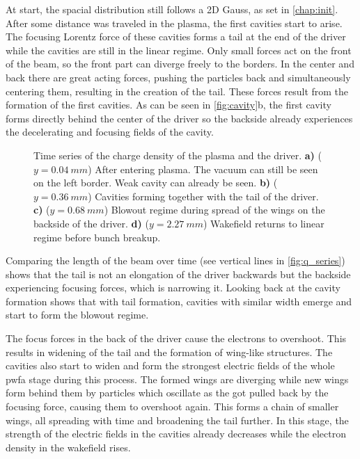 \documentclass[bachelor_thesis]{subfiles}
\begin{document}
At start, the spacial distribution still follows a 2D Gauss, as set in \autoref{chap:init}. After some distance was traveled in the plasma, the first cavities start to arise. The focusing Lorentz force of these cavities forms a tail at the end of the driver while the cavities are still in the linear regime.
Only small forces act on the front of the beam, so the front part can diverge freely to the borders. In the center and back there are great acting forces, pushing the particles back and simultaneously centering them, resulting in the creation of the tail.
These forces result from the formation of the first cavities. As can be seen in \autoref{fig:cavity}b, the first cavity forms directly behind the center of the driver so the backside already experiences the decelerating and focusing fields of the cavity.
\begin{figure}
	\centering
	\missingfigure{}
	\caption{Time series of the charge density of the plasma and the driver.
	\textbf{a)} ($y=\qty{0.04}{mm}$) After entering plasma. The vacuum can still be seen on the left border. Weak cavity can already be seen.
	\textbf{b)} ($y=\qty{0.36}{mm}$) Cavities forming together with the tail of the driver.
	\textbf{c)} ($y=\qty{0.68}{mm}$) Blowout regime during spread of the wings on the backside of the driver.
	\textbf{d)} ($y=\qty{2.27}{mm}$) Wakefield returns to linear regime before bunch breakup.}
	\label{fig:cavity}
\end{figure}
Comparing the length of the beam over time (see vertical lines in \autoref{fig:q_series}) shows that the tail is not an elongation of the driver backwards but the backside experiencing focusing forces, which is narrowing it.
Looking back at the cavity formation shows that with tail formation, cavities with similar width emerge and start to form the blowout regime.

The focus forces in the back of the driver cause the electrons to overshoot. This results in widening of the tail and the formation of wing-like structures. The cavities also start to widen and form the strongest electric fields of the whole \gls{pwfa} stage during this process.
The formed wings are diverging while new wings form behind them by particles which oscillate as the got pulled back by the focusing force, causing them to overshoot again. This forms a chain of smaller wings, all spreading with time and broadening the tail further.
In this stage, the strength of the electric fields in the cavities already decreases while the electron density in the wakefield rises.
\end{document}
